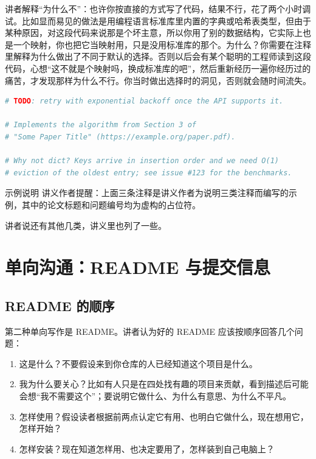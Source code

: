 \documentclass[a4paper]{article}
\begin{document}
讲者解释“为什么不”：也许你按直接的方式写了代码，结果不行，花了两个小时调试。比如显而易见的做法是用编程语言标准库里内置的字典或哈希表类型，但由于某种原因，对这段代码来说那是个坏主意，所以你用了别的数据结构，它实际上也是一个映射，你也把它当映射用，只是没用标准库的那个。为什么？你需要在注释里解释为什么做出了不同于默认的选择。否则以后会有某个聪明的工程师读到这段代码，心想“这不就是个映射吗，换成标准库的吧”，然后重新经历一遍你经历过的痛苦，才发现那样为什么不行。你当时做出选择时的洞见，否则就会随时间流失。

\begin{lstlisting}[language=Python]
# TODO: retry with exponential backoff once the API supports it.

# Implements the algorithm from Section 3 of
# "Some Paper Title" (https://example.org/paper.pdf).

# Why not dict? Keys arrive in insertion order and we need O(1)
# eviction of the oldest entry; see issue #123 for the benchmarks.
\end{lstlisting}

\begin{warningbox}{示例说明}
讲义作者提醒：上面三条注释是讲义作者为说明三类注释而编写的示例，其中的论文标题和问题编号均为虚构的占位符。
\end{warningbox}

讲者说还有其他几类，讲义里也列了一些。

\section{单向沟通：README 与提交信息}

\subsection{README 的顺序}

第二种单向写作是 README。讲者认为好的 README 应该按顺序回答几个问题：
\begin{enumerate}
\item 这是什么？不要假设来到你仓库的人已经知道这个项目是什么。
\item 我为什么要关心？比如有人只是在四处找有趣的项目来贡献，看到描述后可能会想“我不需要这个”；要说明它做什么、为什么有意思、为什么不平凡。
\item 怎样使用？假设读者根据前两点认定它有用、也明白它做什么，现在想用它，怎样开始？
\item 怎样安装？现在知道怎样用、也决定要用了，怎样装到自己电脑上？
\end{enumerate}
\end{document}
